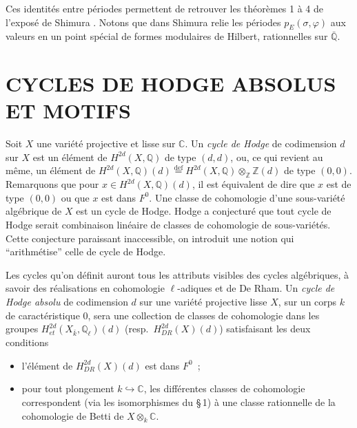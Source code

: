 \documentclass[12pt,a4paper]{article}
\theoremstyle{plain}
\theoremstyle{definition}
\theoremstyle{remark}
\newcommand{\ZZ}{\mathbb{Z}}
\newcommand{\QQ}{\mathbb{Q}}
\newcommand{\CC}{\mathbb{C}}
\providecommand{\CC}{\mathbb{C}}
\providecommand{\QQ}{\mathbb{Q}}
\providecommand{\ZZ}{\mathbb{Z}}
\begin{document}
Ces identités entre périodes permettent de retrouver les théorèmes 1 à 4 de l'exposé de Shimura \cite{Shimura2}. Notons que dans \cite{Shimura2} Shimura relie les périodes $p_E(\sigma, \varphi)$ aux valeurs en un point spécial de formes modulaires de Hilbert, rationnelles sur $\bar{\QQ}$.

\section{CYCLES DE HODGE ABSOLUS ET MOTIFS}

Soit $X$ une variété projective et lisse sur $\CC$. Un \emph{cycle de Hodge} de codimension $d$ sur $X$ est un élément de $H^{2d}(X, \QQ)$ de type $(d,d)$, ou, ce qui revient au même, un élément de $H^{2d}(X, \QQ)(d) \overset{\text{def}}{=} H^{2d}(X, \QQ) \otimes_\ZZ \ZZ(d)$ de type $(0,0)$. Remarquons que pour $x \in H^{2d}(X, \QQ)(d)$, il est équivalent de dire que $x$ est de type $(0,0)$ ou que $x$ est dans $F^0$. Une classe de cohomologie d'une sous-variété algébrique de $X$ est un cycle de Hodge. Hodge a conjecturé que tout cycle de Hodge serait combinaison linéaire de classes de cohomologie de sous-variétés. Cette conjecture paraissant inaccessible, on introduit une notion qui ``arithmétise'' celle de cycle de Hodge.

Les cycles qu'on définit auront tous les attributs visibles des cycles algébriques, à savoir des réalisations en cohomologie $\ell$-adiques et de De Rham. Un \emph{cycle de Hodge absolu} de codimension $d$ sur une variété projective lisse $X$, sur un corps $k$ de caractéristique $0$, sera une collection de classes de cohomologie dans les groupes $H^{2d}_{et}(X_{\bar{k}}, \QQ_\ell)(d)$ (resp.~$H^{2d}_{DR}(X)(d)$) satisfaisant les deux conditions
\begin{itemize}
\item l'élément de $H^{2d}_{DR}(X)(d)$ est dans $F^0$~;
\item pour tout plongement $k \hookrightarrow \CC$, les différentes classes de cohomologie correspondent (via les isomorphismes du \S\,1) à une classe rationnelle de la cohomologie de Betti de $X \otimes_k \CC$.
\end{itemize}
\end{document}
